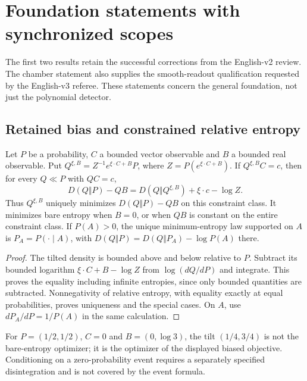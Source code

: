 \section{Foundation statements with synchronized scopes}\label{app:repairs}
The first two results retain the successful corrections from the English-v2 review. The chamber statement also supplies the smooth-readout qualification requested by the English-v3 referee. These statements concern the general foundation, not just the polynomial detector.

\subsection{Retained bias and constrained relative entropy}
\begin{proposition}\label{prop:bias}
Let $P$ be a probability, $C$ a bounded vector observable and $B$ a bounded real observable. Put $Q^{\xi,B}=Z^{-1}e^{\xi\cdot C+B}P$, where $Z=P(e^{\xi\cdot C+B})$. If $Q^{\xi,B}C=c$, then for every $Q\ll P$ with $QC=c$,
\[
 D(Q\Vert P)-QB=D(Q\Vert Q^{\xi,B})+\xi\cdot c-\log Z.
\]
Thus $Q^{\xi,B}$ uniquely minimizes $D(Q\Vert P)-QB$ on this constraint class. It minimizes bare entropy when $B=0$, or when $QB$ is constant on the entire constraint class. If $P(A)>0$, the unique minimum-entropy law supported on $A$ is $P_A=P(\cdot\mid A)$, with
$D(Q\Vert P)=D(Q\Vert P_A)-\log P(A)$ there.
\end{proposition}
\begin{proof}
The tilted density is bounded above and below relative to $P$. Subtract its bounded logarithm $\xi\cdot C+B-\log Z$ from $\log(dQ/dP)$ and integrate. This proves the equality including infinite entropies, since only bounded quantities are subtracted. Nonnegativity of relative entropy, with equality exactly at equal probabilities, proves uniqueness and the special cases. On $A$, use $dP_A/dP=1/P(A)$ in the same calculation.
\end{proof}
For $P=(1/2,1/2)$, $C=0$ and $B=(0,\log3)$, the tilt $(1/4,3/4)$ is not the bare-entropy optimizer; it is the optimizer of the displayed biased objective. Conditioning on a zero-probability event requires a separately specified disintegration and is not covered by the event formula.

